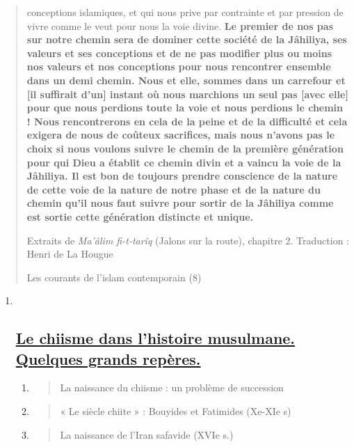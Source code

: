 \begin{quote}
conceptions islamiques, et qui nous prive par contrainte et par pression
de vivre comme le veut pour nous la voie divine. \textbf{Le premier de
nos pas sur notre chemin sera de dominer cette société de la Jâhiliya,
ses valeurs et ses conceptions et de ne pas modifier plus ou moins nos
valeurs et nos conceptions pour nous rencontrer ensemble dans un demi
chemin. Nous et elle, sommes dans un carrefour et {[}il suffirait
d'un{]} instant où nous marchions un seul pas {[}avec elle{]} pour que
nous perdions toute la voie et nous perdions le chemin ! Nous
rencontrerons en cela de la peine et de la difficulté et cela exigera de
nous de coûteux sacrifices, mais nous n'avons pas le choix si nous
voulons suivre le chemin de la première génération pour qui Dieu a
établit ce chemin divin et a vaincu la voie de la Jâhiliya. Il est bon
de toujours prendre conscience de la nature de cette voie de la nature
de notre phase et de la nature du chemin qu'il nous faut suivre pour
sortir de la Jâhiliya comme est sortie cette génération distincte et
unique.}

Extraits de \emph{Ma'âlim fi-t-tarîq} (Jalons sur la route), chapitre 2.
Traduction : Henri de La Hougue

Les courants de l'islam contemporain (8)
\end{quote}

\begin{enumerate}
\def\labelenumi{\Roman{enumi}.}
\item ~
  \hypertarget{le-chiisme-dans-lhistoire-musulmane.-quelques-grands-repuxe8res.}{%
  \subsection{\texorpdfstring{\underline{Le chiisme dans l'histoire
  musulmane. Quelques grands
  repères.}}{Le chiisme dans l'histoire musulmane. Quelques grands repères.}}\label{le-chiisme-dans-lhistoire-musulmane.-quelques-grands-repuxe8res.}}

  \begin{enumerate}
  \def\labelenumii{\arabic{enumii}.}
  \item
    \begin{quote}
    La naissance du chiisme : un problème de succession
    \end{quote}
  \item
    \begin{quote}
    « Le siècle chiite » : Bouyides et Fatimides (Xe-XIe s)
    \end{quote}
  \item
    \begin{quote}
    La naissance de l'Iran safavide (XVIe s.)
    \end{quote}
  \end{enumerate}
\end{enumerate}

